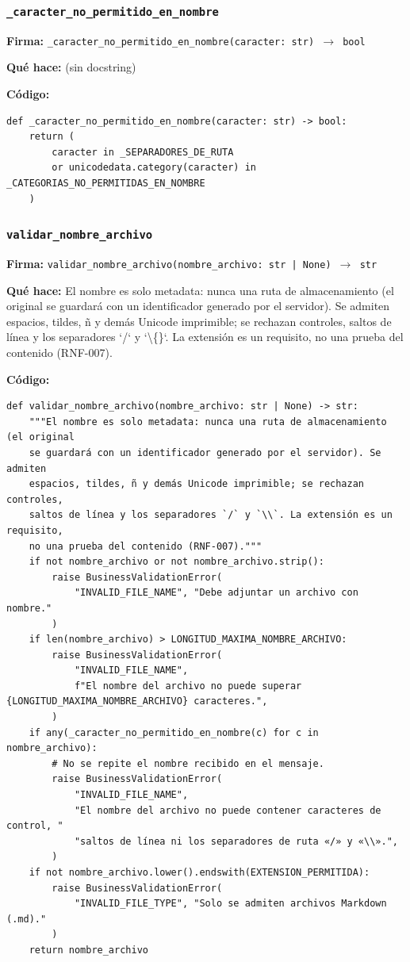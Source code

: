 \documentclass[11pt,a4paper]{article}
\begin{document}
\subsubsection*{\texttt{\_caracter\_no\_permitido\_en\_nombre}}
\textbf{Firma:} \texttt{\_caracter\_no\_permitido\_en\_nombre(caracter: str) $\rightarrow$ bool}

\textbf{Qué hace:} (sin docstring)

\textbf{Código:}
\begin{lstlisting}
def _caracter_no_permitido_en_nombre(caracter: str) -> bool:
    return (
        caracter in _SEPARADORES_DE_RUTA
        or unicodedata.category(caracter) in _CATEGORIAS_NO_PERMITIDAS_EN_NOMBRE
    )
\end{lstlisting}

\subsubsection*{\texttt{validar\_nombre\_archivo}}
\textbf{Firma:} \texttt{validar\_nombre\_archivo(nombre\_archivo: str | None) $\rightarrow$ str}

\textbf{Qué hace:} El nombre es solo metadata: nunca una ruta de almacenamiento (el original
se guardará con un identificador generado por el servidor). Se admiten
espacios, tildes, ñ y demás Unicode imprimible; se rechazan controles,
saltos de línea y los separadores `/` y `\textbackslash\{\}`. La extensión es un requisito,
no una prueba del contenido (RNF-007).

\textbf{Código:}
\begin{lstlisting}
def validar_nombre_archivo(nombre_archivo: str | None) -> str:
    """El nombre es solo metadata: nunca una ruta de almacenamiento (el original
    se guardará con un identificador generado por el servidor). Se admiten
    espacios, tildes, ñ y demás Unicode imprimible; se rechazan controles,
    saltos de línea y los separadores `/` y `\\`. La extensión es un requisito,
    no una prueba del contenido (RNF-007)."""
    if not nombre_archivo or not nombre_archivo.strip():
        raise BusinessValidationError(
            "INVALID_FILE_NAME", "Debe adjuntar un archivo con nombre."
        )
    if len(nombre_archivo) > LONGITUD_MAXIMA_NOMBRE_ARCHIVO:
        raise BusinessValidationError(
            "INVALID_FILE_NAME",
            f"El nombre del archivo no puede superar {LONGITUD_MAXIMA_NOMBRE_ARCHIVO} caracteres.",
        )
    if any(_caracter_no_permitido_en_nombre(c) for c in nombre_archivo):
        # No se repite el nombre recibido en el mensaje.
        raise BusinessValidationError(
            "INVALID_FILE_NAME",
            "El nombre del archivo no puede contener caracteres de control, "
            "saltos de línea ni los separadores de ruta «/» y «\\».",
        )
    if not nombre_archivo.lower().endswith(EXTENSION_PERMITIDA):
        raise BusinessValidationError(
            "INVALID_FILE_TYPE", "Solo se admiten archivos Markdown (.md)."
        )
    return nombre_archivo
\end{lstlisting}
\end{document}
